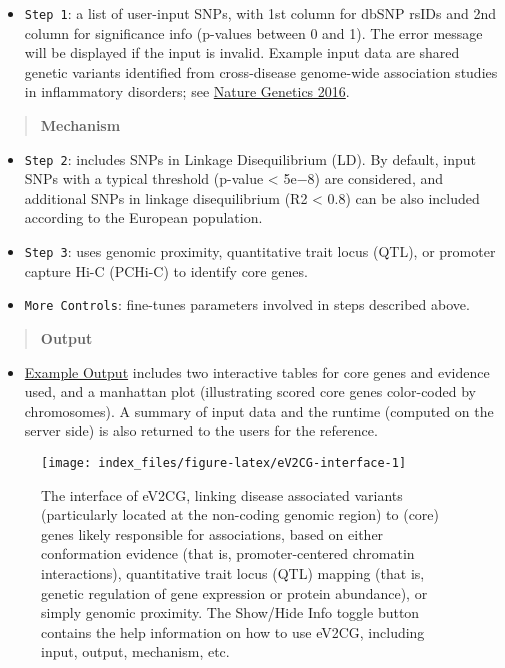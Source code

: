 \documentclass[
  oneside]{book}
\providecommand{\tightlist}{%
  \setlength{\itemsep}{0pt}\setlength{\parskip}{0pt}}
\begin{document}
\begin{itemize}
\tightlist
\item
  \texttt{Step\ 1}: a list of user-input SNPs, with 1st column for dbSNP rsIDs and 2nd column for significance info (p-values between 0 and 1). The error message will be displayed if the input is invalid. Example input data are shared genetic variants identified from cross-disease genome-wide association studies in inflammatory disorders; see \href{https://www.ncbi.nlm.nih.gov/pubmed/26974007}{Nature Genetics 2016}.
\end{itemize}

\begin{quote}
\textbf{Mechanism}
\end{quote}

\begin{itemize}
\item
  \texttt{Step\ 2}: includes SNPs in Linkage Disequilibrium (LD). By default, input SNPs with a typical threshold (p-value \textless{} 5e−8) are considered, and additional SNPs in linkage disequilibrium (R2 \textless{} 0.8) can be also included according to the European population.
\item
  \texttt{Step\ 3}: uses genomic proximity, quantitative trait locus (QTL), or promoter capture Hi-C (PCHi-C) to identify core genes.
\item
  \texttt{More\ Controls}: fine-tunes parameters involved in steps described above.
\end{itemize}

\begin{quote}
\textbf{Output}
\end{quote}

\begin{itemize}
\tightlist
\item
  \href{http://www.genetictargets.com/app/examples/_tmp_RMD_eV2CG.html}{Example Output} includes two interactive tables for core genes and evidence used, and a manhattan plot (illustrating scored core genes color-coded by chromosomes). A summary of input data and the runtime (computed on the server side) is also returned to the users for the reference.
\end{itemize}

\begin{figure}

{\centering \texttt{[image: index\_files/figure-latex/eV2CG-interface-1]} 

}

\caption{The interface of eV2CG, linking disease associated variants (particularly located at the non-coding genomic region) to (core) genes likely responsible for associations, based on either conformation evidence (that is, promoter-centered chromatin interactions), quantitative trait locus (QTL) mapping (that is, genetic regulation of gene expression or protein abundance), or simply genomic proximity. The Show/Hide Info toggle button contains the help information on how to use eV2CG, including input, output, mechanism, etc.}\label{fig:eV2CG-interface}
\end{figure}
\end{document}
